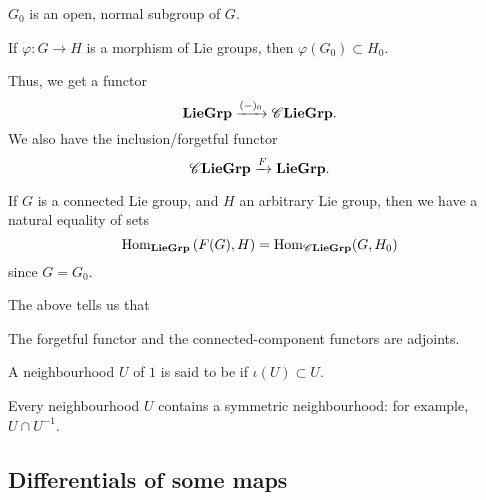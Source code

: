 \documentclass[12pt]{article}
\begin{document}
\begin{thm}
	$G_{0}$ is an open, normal subgroup of $G$.

	If $\varphi \colon G \to H$ is a morphism of Lie groups, then $\varphi(G_{0}) \subset H_{0}$.
\end{thm}

Thus, we get a functor
\begin{equation*} 
	\mathbf{LieGrp} \xrightarrow{(-)_{0}} \mathscr{C}\mathbf{LieGrp}.
\end{equation*}
We also have the inclusion/forgetful functor
\begin{equation*} 
	\mathscr{C}\mathbf{LieGrp} \xrightarrow{F} \mathbf{LieGrp}.
\end{equation*}

If $G$ is a connected Lie group, and $H$ an arbitrary Lie group, 
then we have a natural equality of sets
\begin{equation*} 
	\operatorname{Hom}_{\mathbf{LieGrp}}\left(F(G), H\right) = \operatorname{Hom}_{\mathscr{C}\mathbf{LieGrp}}(G, H_{0})
\end{equation*}
since $G = G_{0}$. 

The above tells us that
\begin{thm}
	The forgetful functor and the connected-component functors are adjoints.
\end{thm}

\begin{defn}
	A neighbourhood $U$ of $1$ is said to be  if $\iota(U) \subset U$.
\end{defn}
Every neighbourhood $U$ contains a symmetric neighbourhood: for example, $U \cap U^{-1}$.

\subsection{Differentials of some maps}
\end{document}
